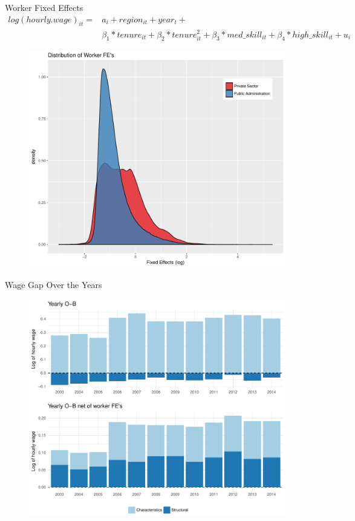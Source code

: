 \documentclass[xcolor={dvipsnames},8pt]{beamer}
\theoremstyle{definition}
\begin{document}
\begin{frame}{Worker Fixed Effects}
\tiny{
\begin{align*}
    log(hourly.wage)_{it} =& a_i + region_{it} + year_t + \\
     &\beta_1*tenure_{it} + \beta_2*tenure^2_{it} + \beta_3*med\_skill_{it} + \beta_4*high\_skill_{it} + u_i
\end{align*}}%

\begin{figure}[h]
    \centering
    \includegraphics[scale = 0.32]{graphs/001_fe_onepc.pdf}
\end{figure}
\end{frame}

\begin{frame}{Wage Gap Over the Years}
\begin{figure}[h]
    \centering
    \includegraphics[scale = 0.45]{graphs/002_yearly_ob_onepc.pdf}
\end{figure}
\end{frame}
\end{document}
